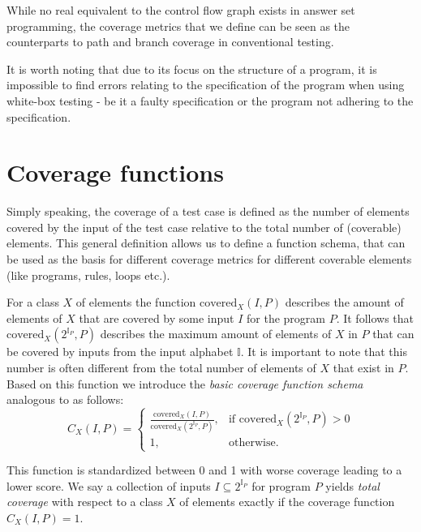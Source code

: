 While no real equivalent to the control flow graph exists in answer set programming, the coverage metrics that we define can be seen as the counterparts to path and branch coverage in conventional testing.

It is worth noting that due to its focus on the structure of a program, it is impossible to find errors relating to the specification of the program when using white-box testing - be it a faulty specification or the program not adhering to the specification.


\section{Coverage functions}
\label{sec:Coverage metrics/Coverage functions}
Simply speaking, the coverage of a test case is defined as the number of elements covered by the input of the test case relative to the total number of (coverable) elements. This general definition allows us to define a function schema, that can be used as the basis for different coverage metrics for different coverable elements (like programs, rules, loops etc.). 

For a class $X$ of elements the function \(\text{covered}_X(I, P)\) describes the amount of elements of $X$ that are covered by some input $I$ for the program $P$. It follows that \(\text{covered}_X(2^{\mathbb{I}_P}, P)\) describes the maximum amount of elements of $X$ in $P$ that can be covered by inputs from the input alphabet \(\mathbb{I}\). It is important to note that this number is often different from the total number of elements of $X$ that exist in $P$. Based on this function we introduce the \emph{basic coverage function schema} analogous to  \textcite{Jan+10} as follows:
\begin{equation}
\label{eq:coverage function schema}
    C_X(I, P) = 
    \begin{cases}
        \frac{\text{covered}_X(I, P)}{\text{covered}_X(2^{\mathbb{I}_P}, P)}, & \text{if covered}_X(2^{\mathbb{I}_P}, P) > 0 \\
        1, & \text{otherwise.}
    \end{cases}
\end{equation}

This function is standardized between 0 and 1 with worse coverage leading to a lower score. We say a collection of inputs \(I \subseteq 2^{\mathbb{I}_P}\) for program $P$ yields \emph{total coverage} with respect to a class $X$ of elements exactly if the coverage function $C_X(I, P) = 1$.

